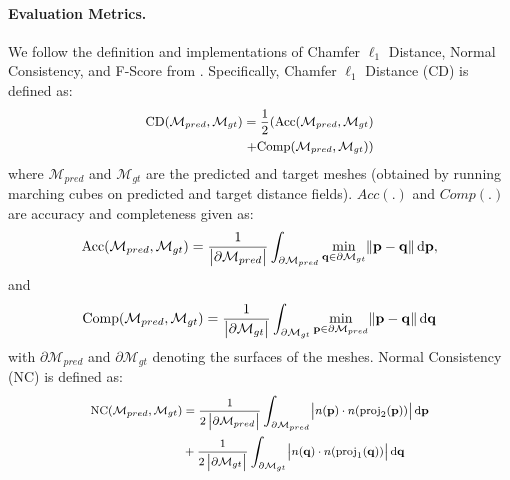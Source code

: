 \paragraph{Evaluation Metrics.}
%
We follow the definition and implementations of Chamfer $\ell_1$ Distance, Normal Consistency, and F-Score from \cite{peng2020convolutional}.
%
Specifically, Chamfer $\ell_1$ Distance (CD) is defined as:
\begin{equation*}
    \small
    \begin{split}
        \mathrm{CD}(\mathcal{M}_{pred}, \mathcal{M}_{gt}) = \frac{1}{2}(\mathrm{Acc}(\mathcal{M}_{pred}, \mathcal{M}_{gt}) \\ +  \mathrm{Comp}(\mathcal{M}_{pred}, \mathcal{M}_{gt}))
    \end{split}
\end{equation*}
where $\mathcal{M}_{pred}$ and $\mathcal{M}_{gt}$ are the predicted and target meshes (obtained by running marching cubes on predicted and target distance fields).
%
$Acc(.)$ and $Comp(.)$ are accuracy and completeness given as:
\small
\begin{equation*}
        \mathrm{Acc}(\mathcal{M}_{pred}, \mathcal{M}_{gt}) = \frac{1}{\left|\partial\mathcal{M}_{pred}\right|}\int_{\partial\mathcal{M}_{pred}}\min_{\mathbf{q}\in \partial\mathcal{M}_{gt}}\norm{\mathbf{p} - \mathbf{q}}\mathrm{d}\mathbf{p},
\end{equation*}
\normalsize
and
\small
\begin{equation*}
    \mathrm{Comp}(\mathcal{M}_{pred}, \mathcal{M}_{gt}) = \frac{1}{\left|\partial\mathcal{M}_{gt}\right|}\int_{\partial\mathcal{M}_{gt}}\min_{\mathbf{p}\in \partial\mathcal{M}_{pred}}\norm{\mathbf{p} - \mathbf{q}}\mathrm{d}\mathbf{q}
\end{equation*}
\normalsize
with $\partial\mathcal{M}_{pred}$ and $\partial\mathcal{M}_{gt}$ denoting the surfaces of the meshes.
%
Normal Consistency (NC) is defined as:
\begin{align*}
    \footnotesize
    \begin{split}
    \mathrm{NC}(\mathcal{M}_{pred}, \mathcal{M}_{gt}) &= \frac{1}{2\left|\partial\mathcal{M}_{pred}\right|}\int_{\partial\mathcal{M}_{pred}}\abs{n(\mathbf{p}) \cdot n(\mathrm{proj}_2(\mathbf{p}))}\mathrm{d}\mathbf{p} \\ &+
    \frac{1}{2\left|\partial\mathcal{M}_{gt}\right|}\int_{\partial\mathcal{M}_{gt}}\abs{n(\mathbf{q}) \cdot n(\mathrm{proj}_1(\mathbf{q}))}\mathrm{d}\mathbf{q}
    \end{split}
\end{align*}
